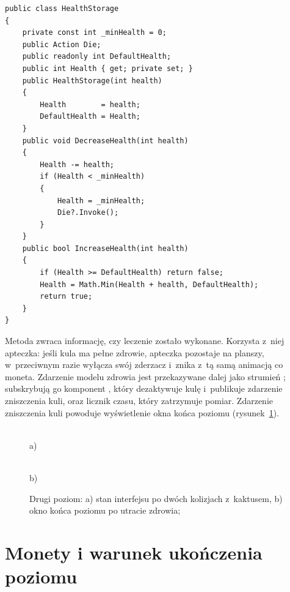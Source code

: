 \begin{lstlisting}[caption={Przechowywanie punktów życia w~klasie HealthStorage; \zrodloWlasne},label=lst:zdrowie]
public class HealthStorage
{
    private const int _minHealth = 0;
    public Action Die;
    public readonly int DefaultHealth;
    public int Health { get; private set; }
    public HealthStorage(int health)
    {
        Health        = health;
        DefaultHealth = Health;
    }
    public void DecreaseHealth(int health)
    {
        Health -= health;
        if (Health < _minHealth)
        {
            Health = _minHealth;
            Die?.Invoke();
        }
    }
    public bool IncreaseHealth(int health)
    {
        if (Health >= DefaultHealth) return false;
        Health = Math.Min(Health + health, DefaultHealth);
        return true;
    }
}
\end{lstlisting}

Metoda  zwraca informację, czy leczenie zostało wykonane. Korzysta
z~niej apteczka: jeśli kula ma pełne zdrowie, apteczka pozostaje na planszy, w~przeciwnym
razie wyłącza swój zderzacz i~znika z~tą samą animacją co moneta. Zdarzenie 
modelu zdrowia jest przekazywane dalej jako strumień ; subskrybują go
komponent , który dezaktywuje kulę i~publikuje zdarzenie zniszczenia
kuli, oraz licznik czasu, który zatrzymuje pomiar. Zdarzenie zniszczenia kuli powoduje
wyświetlenie okna końca poziomu (rysunek~\ref{rys:obrazenia}).

\begin{figure}[!htb]
  \centering
  \begin{minipage}{0.49\textwidth}
    \centering
    \\[2pt]
    {\small a)}
  \end{minipage}\hfill
  \begin{minipage}{0.49\textwidth}
    \centering
    \\[2pt]
    {\small b)}
  \end{minipage}
  \caption{Drugi poziom: a) stan interfejsu po dwóch kolizjach z~kaktusem, b) okno końca
    poziomu po utracie zdrowia; \zrodloWlasne}
  \label{rys:obrazenia}
\end{figure}

\section{Monety i warunek ukończenia poziomu}
\label{sec:monety}

